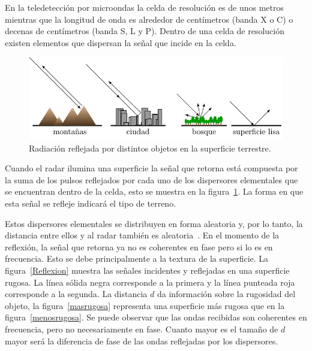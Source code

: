 
En la teledetección por microondas la celda de resolución es de unos metros mientras que la longitud de onda es alrededor de centímetros (banda X o C) o decenas de centímetros (banda S, L y P). Dentro de una celda de resolución existen elementos que dispersan la señal que incide en la celda.

\begin{figure}[hbt]
	\centering    
	\includegraphics[scale=1]{../../Figures/Tesis/Capitulo3/Backscatter2.pdf}
	\caption{\label{Backscatter}Radiación reflejada por distintos objetos en la superficie terrestre.}
\end{figure} 

Cuando el radar ilumina una superficie la señal que retorna está compuesta por la suma de los pulsos reflejados por cada uno de los dispersores elementales que se encuentran dentro de la celda, esto se muestra en la figura~\ref{Backscatter}. La forma en que esta señal se refleje indicará el tipo de terreno.

Estos dispersores elementales se distribuyen en forma aleatoria y, por lo tanto, la distancia entre ellos y al radar también es aleatoria~\cite{Lee2009}. 
En el momento de la reflexión, la señal que retorna ya no es coherentes en fase pero si lo es en frecuencia. Esto se debe principalmente a la textura de la superficie. La figura~\ref{Reflexion} muestra las señales incidentes y reflejadas en una superficie rugosa. La línea sólida negra corresponde a la primera y la línea punteada roja corresponde a la segunda. La distancia $d$ da información sobre la rugosidad del objeto, la figura~\ref{masrugosa} representa una superficie más rugosa que en la figura~\ref{menosrugosa}. Se puede observar que las ondas recibidas son coherentes en frecuencia, pero no necesariamente en fase. Cuanto mayor es el tamaño de $d$ mayor será la diferencia de fase de las ondas reflejadas por los dispersores.


